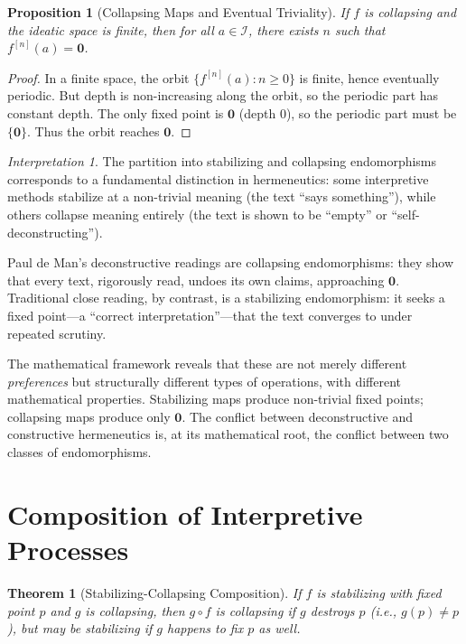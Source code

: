 \documentclass[11pt,openany]{book}
\theoremstyle{definition}
\theoremstyle{plain}
\newtheorem{theorem}[axiom]{Theorem}
\newtheorem{proposition}[axiom]{Proposition}
\theoremstyle{remark}
\newtheorem{interpretation}[axiom]{Interpretation}
\newcommand{\IS}{\mathcal{I}}               %
\newcommand{\void}{\mathbf{0}}              %
\begin{document}
\begin{proposition}[Collapsing Maps and Eventual Triviality]
If $f$ is collapsing and the ideatic space is finite, then for all $a \in \IS$, there exists $n$ such that $f^{[n]}(a) = \void$.
\end{proposition}

\begin{proof}
In a finite space, the orbit $\{f^{[n]}(a) : n \geq 0\}$ is finite, hence eventually periodic. But depth is non-increasing along the orbit, so the periodic part has constant depth. The only fixed point is $\void$ (depth $0$), so the periodic part must be $\{\void\}$. Thus the orbit reaches $\void$.
\end{proof}

\begin{interpretation}
The partition into stabilizing and collapsing endomorphisms corresponds to a fundamental distinction in hermeneutics: some interpretive methods stabilize at a non-trivial meaning (the text ``says something''), while others collapse meaning entirely (the text is shown to be ``empty'' or ``self-deconstructing'').

Paul de Man's deconstructive readings are collapsing endomorphisms: they show that every text, rigorously read, undoes its own claims, approaching $\void$. Traditional close reading, by contrast, is a stabilizing endomorphism: it seeks a fixed point---a ``correct interpretation''---that the text converges to under repeated scrutiny.

The mathematical framework reveals that these are not merely different \emph{preferences} but structurally different types of operations, with different mathematical properties. Stabilizing maps produce non-trivial fixed points; collapsing maps produce only $\void$. The conflict between deconstructive and constructive hermeneutics is, at its mathematical root, the conflict between two classes of endomorphisms.
\end{interpretation}

\section{Composition of Interpretive Processes}

\begin{theorem}[Stabilizing-Collapsing Composition]
If $f$ is stabilizing with fixed point $p$ and $g$ is collapsing, then $g \circ f$ is collapsing if $g$ destroys $p$ (i.e., $g(p) \neq p$), but may be stabilizing if $g$ happens to fix $p$ as well.
\end{theorem}
\end{document}
